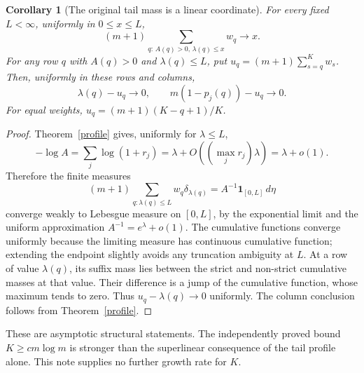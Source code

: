 \documentclass[11pt]{article}
\newtheorem{corollary}{Corollary}
\begin{document}
\begin{corollary}[The original tail mass is a linear coordinate]\label{tail}
For every fixed $L<\infty$, uniformly in $0\le x\le L$,
\[
 (m+1)\sum_{q:\,A(q)>0,\,\lambda(q)\le x}w_q\longrightarrow x.
\]
For any row $q$ with $A(q)>0$ and $\lambda(q)\le L$, put
$u_q=(m+1)\sum_{s=q}^K w_s$. Then, uniformly in these rows and columns,
\[
 \lambda(q)-u_q\longrightarrow0,\qquad
 m(1-p_j(q))-u_q\longrightarrow0.
\]
For equal weights, $u_q=(m+1)(K-q+1)/K$.
\end{corollary}
\begin{proof}
Theorem~\ref{profile} gives, uniformly for $\lambda\le L$,
\[
 -\log A=\sum_j\log(1+r_j)
 =\lambda+O\left((\max_jr_j)\lambda\right)=\lambda+o(1).
\]
Therefore the finite measures
\[
 (m+1)\sum_{q:\lambda(q)\le L}w_q\delta_{\lambda(q)}
 = A^{-1}\boldsymbol1_{[0,L]}\,d\eta
\]
converge weakly to Lebesgue measure on $[0,L]$, by the exponential
limit and the uniform approximation $A^{-1}=e^\lambda+o(1)$.
The cumulative functions converge uniformly because the limiting
measure has continuous cumulative function; extending the endpoint
slightly avoids any truncation ambiguity at $L$.
At a row of value $\lambda(q)$, its suffix mass lies between the
strict and non-strict cumulative masses at that value. Their difference
is a jump of the cumulative function, whose maximum tends to zero.
Thus $u_q-\lambda(q)\to0$ uniformly. The column conclusion follows
from Theorem~\ref{profile}.
\end{proof}

These are asymptotic structural statements. The independently proved
bound $K\ge c m\log m$ is stronger than the superlinear consequence
of the tail profile alone. This note supplies no further growth rate
for $K$.
\end{document}
